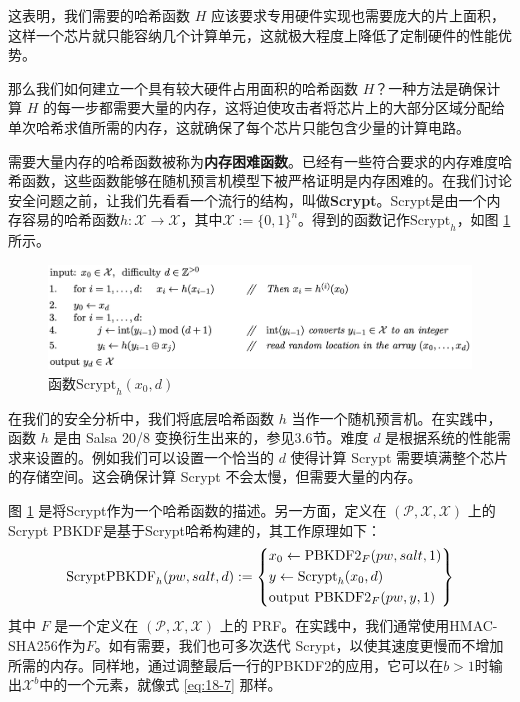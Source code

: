 这表明，我们需要的哈希函数 $H$ 应该要求专用硬件实现也需要庞大的片上面积，这样一个芯片就只能容纳几个计算单元，这就极大程度上降低了定制硬件的性能优势。

那么我们如何建立一个具有较大硬件占用面积的哈希函数 $H$？一种方法是确保计算 $H$ 的每一步都需要大量的内存，这将迫使攻击者将芯片上的大部分区域分配给单次哈希求值所需的内存，这就确保了每个芯片只能包含少量的计算电路。

需要大量内存的哈希函数被称为\textbf{内存困难函数}。已经有一些符合要求的内存难度哈希函数，这些函数能够在随机预言机模型下被严格证明是内存困难的。在我们讨论安全问题之前，让我们先看看一个流行的结构，叫做\textbf{Scrypt}。Scrypt是由一个内存容易的哈希函数$h:\mathcal{X}\rightarrow\mathcal{X}$，其中$\mathcal{X}:=\{0,1\}^n$。得到的函数记作$\text{Scrypt}_h$，如图 \ref{fig:18-6} 所示。

\begin{figure}
  \centering
  \includegraphics[width=0.85\linewidth]{figures/chapter18/fig6.png}
  \caption{函数$\text{Scrypt}_h(x_0,d)$}
  \label{fig:18-6}
\end{figure}

在我们的安全分析中，我们将底层哈希函数 $h$ 当作一个随机预言机。在实践中，函数 $h$ 是由 Salsa 20/8 变换衍生出来的，参见3.6节。难度 $d$ 是根据系统的性能需求来设置的。例如我们可以设置一个恰当的 $d$ 使得计算 Scrypt 需要填满整个芯片的存储空间。这会确保计算 Scrypt 不会太慢，但需要大量的内存。

图 \ref{fig:18-6} 是将Scrypt作为一个哈希函数的描述。另一方面，定义在 $(\mathcal{P},\mathcal{X},\mathcal{X})$ 上的Scrypt PBKDF是基于Scrypt哈希构建的，其工作原理如下：
\begin{equation}\label{eq:18-8}
	{\rm ScryptPBKDF}_h(pw,salt,d):=
	\left\{
	\begin{aligned}
		& x_0\leftarrow {\rm PBKDF2}_F(pw,salt,1)\\
		& y\leftarrow \text{Scrypt}_h(x_0,d)\\
		& \text{output }{\rm PBKDF2}_F(pw,y,1)
	\end{aligned}
	\right\}
\end{equation}
其中 $F$ 是一个定义在 $(\mathcal{P},\mathcal{X},\mathcal{X})$ 上的 PRF。在实践中，我们通常使用HMAC-SHA256作为$F$。如有需要，我们也可多次迭代 Scrypt，以使其速度更慢而不增加所需的内存。同样地，通过调整最后一行的PBKDF2的应用，它可以在$b>1$时输出$\mathcal{X}^b$中的一个元素，就像式 \ref{eq:18-7} 那样。

